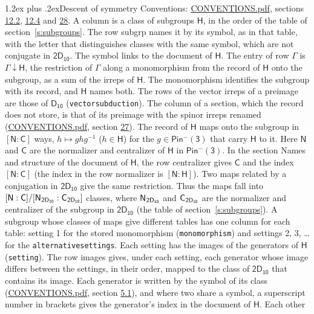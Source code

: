 \documentclass[10pt,a4paper]{article}
\makeatletter
\renewcommand\section{\@startsection{section}{1}{\z@}{-3ex plus -1ex minus -.2ex}%
  {1.2ex plus .2ex}{\normalfont\large\sffamily\bfseries\color{parttitle}}}
\numberwithin{equation}{section}
\newcommand{\grp}[1]{\mathsf{#1}}
\newcommand{\grpindex}[2]{[#1 : #2]}
\newcommand{\restr}[2]{#1\!\downarrow#2}
\newcommand{\hairsp}{\mkern1mu}
\makeatother
\begin{document}
\section{Descent of symmetry}\label{s:subduction}
Conventions: \href{../../CONVENTIONS.pdf}{CONVENTIONS.pdf}, sections \href{../../../rotation/CONVENTIONS.pdf\#conv.12.2}{12.2}, \href{../../../rotation/CONVENTIONS.pdf\#conv.12.4}{12.4} and \href{../../CONVENTIONS.pdf\#conv.28}{28}.
A column is a class of subgroups $\grp{H}$, in the order of the table of section~\ref{s:subgroups}. The row subgrp names it by its symbol, as in that table, with the letter that distinguishes classes with the same symbol, which are not conjugate in $\grp{2D_{10}}$. The symbol links to the document of $\grp{H}$. The entry of row $\Gamma$ is $\restr{\Gamma}{\grp{H}}$, the restriction of $\Gamma$ along a monomorphism from the record of $\grp{H}$ onto the subgroup, as a sum of the irreps of $\grp{H}$. The monomorphism identifies the subgroup with its record, and $\grp{H}$ names both. The rows of the vector irreps of a preimage are those of \href{../../../rotation/data/pdf/D10.pdf}{$\grp{D_{10}}$} (\texttt{vectorsubduction}). The column of a section, which the record does not store, is that of its preimage with the spinor irreps renamed (\href{../../CONVENTIONS.pdf}{CONVENTIONS.pdf}, section \href{../../CONVENTIONS.pdf\#conv.27}{27}). \label{n:group.normalizer.o3}\label{n:group.centralizer.o3}\label{n:element.h}The record of $\grp{H}$ maps onto the subgroup in $\grpindex{\grp{N}}{\grp{C}}$ ways, $h \mapsto g h g^{-1}$ ($h \in \grp{H}$) for the $g \in \grp{Pin^{-}(3)}$ that carry $\grp{H}$ to it. Here $\grp{N}$ and $\grp{C}$ are the normalizer and centralizer of $\grp{H}$ in \href{Pinminus3.pdf}{$\grp{Pin^{-}(3)}$}. In the section Names and structure of the document of $\grp{H}$, the row centralizer gives $\grp{C}$ and the index $\grpindex{\grp{N}}{\grp{C}}$ (the index in the row normalizer is $\grpindex{\grp{N}}{\grp{H}}$). Two maps related by a conjugation in $\grp{2D_{10}}$ give the same restriction. Thus the maps fall into $\grpindex{\grp{N}}{\grp{C}}/\grpindex{\grp{N}_{\hairsp \grp{2D_{10}}}}{\grp{C}_{\hairsp \grp{2D_{10}}}}$ classes, where $\grp{N}_{\hairsp \grp{2D_{10}}}$ and $\grp{C}_{\hairsp \grp{2D_{10}}}$ are the normalizer and centralizer of the subgroup in $\grp{2D_{10}}$ (the table of section~\ref{s:subgroups}). \label{n:head.setting}A subgroup whose classes of maps give different tables has one column for each table: setting 1 for the stored monomorphism (\texttt{monomorphism}) and settings 2, 3, \dots{} for the \texttt{alternativesettings}. Each setting has the images of the generators of $\grp{H}$ (\texttt{setting}). \label{n:head.images}The row images gives, under each setting, each generator whose image differs between the settings, in their order, mapped to the class of $\grp{2D_{10}}$ that contains its image. \label{n:element.generator.index}Each generator is written by the symbol of its class (\href{../../CONVENTIONS.pdf}{CONVENTIONS.pdf}, section \href{../../../rotation/CONVENTIONS.pdf\#conv.5.1}{5.1}), and where two share a symbol, a superscript number in brackets gives the generator's index in the document of $\grp{H}$. \label{n:irrep.Delta}Each other 
\end{document}
